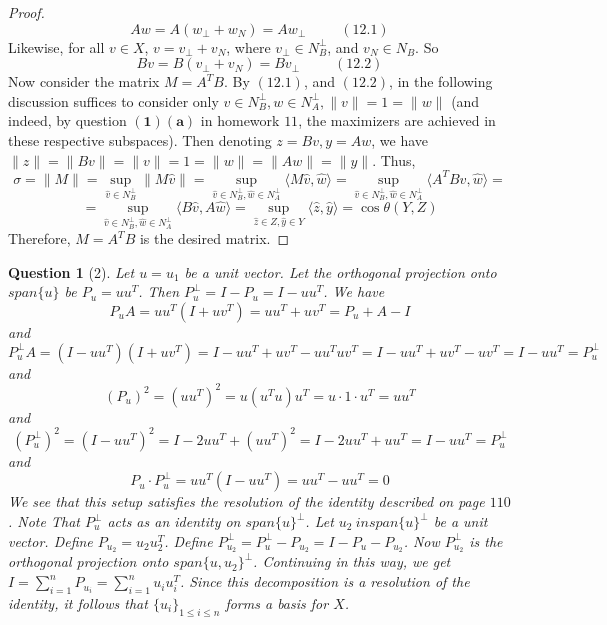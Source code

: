 \documentclass[11pt]{article}
\theoremstyle{quest}
\newtheorem*{question}{Question}
\begin{document}
\begin{proof}
$$Aw = A(w_{\perp} + w_N) = Aw_{\perp}\ \ \ \ \ \ \ \ \ \ \ (12.1)$$
Likewise, for all $v \in X$, $v = v_{\perp} + v_N$, where $v_{\perp} \in N_B^{\perp}$, and $v_N \in N_B$. So
$$Bv = B(v_{\perp} + v_N) = Bv_{\perp}\ \ \ \ \ \ \ \ \ \ \ (12.2)$$
Now consider the matrix $M = A^TB$. By $(12.1)$, and $(12.2)$, in the following discussion suffices to consider only $v \in N_B^{\perp}, w \in N_A^{\perp}, \|v\| = 1 = \|w\|$ (and indeed, by question $\mathbf{(1)(a)}$ in homework $11$, the maximizers are achieved in these respective subspaces). Then denoting $z= Bv, y = Aw$, we have $\|z\| = \|Bv\| = \|v\| = 1 = \|w\| = \|Aw\| = \|y\|$. Thus,
$$\sigma = \|M\| = \sup_{\hat{v} \in N_B^{\perp}} \|M\hat{v}\| = \sup_{\hat{v} \in N_B^{\perp},\hat{w} \in N_A^{\perp}} \langle M\hat{v}, \hat{w} \rangle = \sup_{\hat{v} \in N_B^{\perp},\hat{w} \in N_A^{\perp}} \langle A^TB \hat{v}, \hat{w} \rangle = $$ $$= \sup_{\hat{v} \in N_B^{\perp},\hat{w} \in N_A^{\perp}} \langle B \hat{v}, A \hat{w} \rangle = \sup_{\hat{z} \in Z, \hat{y} \in Y} \langle \hat{z}, \hat{y} \rangle = \cos \theta(Y, Z)$$
Therefore, $M = A^TB$ is the desired matrix.
\end{proof}

\begin{question}[2]
Let $u = u_1$ be a unit vector. Let the orthogonal projection onto $span\{u\}$ be $P_u = uu^T$. Then $P_u^{\perp} = I - P_u = I - uu^T$. We have
$$P_u A = uu^T(I + uv^T) = uu^T + uv^T = P_u + A - I$$
and
$$P_u^{\perp} A = (I - uu^T)(I + uv^T) = I - uu^T + uv^T - uu^Tuv^T = I - uu^T + uv^T - uv^T = I - uu^T = P_u^{\perp}$$
and
$$(P_u)^2 = (uu^T)^2 = u(u^Tu)u^T = u \cdot 1 \cdot u^T = uu^T$$
and
$$(P_u^{\perp})^2 = (I - uu^T)^2 = I - 2uu^T + (uu^T)^2 = I - 2uu^T + uu^T = I - uu^T = P_u^{\perp}$$
and
$$P_u \cdot P_u^{\perp} = uu^T(I - uu^T) = uu^T - uu^T = 0$$
We see that this setup satisfies the resolution of the identity described on page $110$.
Note That $P_u^{\perp}$ acts as an identity on $span\{u\}^{\perp}$. Let $u_2 \ in span\{u\}^{\perp}$ be a unit vector. Define $P_{u_2} = u_2 u_2^T$. Define $P_{u_2}^{\perp} = P_{u}^{\perp} - P_{u_2} = I - P_u - P_{u_2}$. Now $P_{u_2}^{\perp}$ is the orthogonal projection onto $span\{u, u_2\}^{\perp}$. Continuing in this way, we get $I = \sum_{i=1}^n P_{u_i} = \sum_{i=1}^n u_i u_i^T$. Since this decomposition is a resolution of the identity, it follows that $\{u_i\}_{1 \le i \le n}$ forms a basis for $X$.
\end{question}
\end{document}

